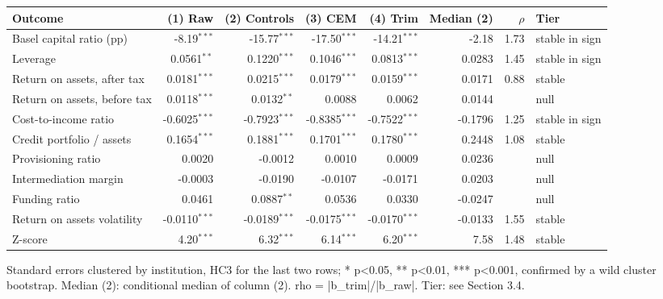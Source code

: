 \footnotesize
\setlength{\tabcolsep}{3pt}
\begin{tabular}{lrrrrrrl}
\toprule
Outcome & (1) Raw & (2) Controls & (3) CEM & (4) Trim & Median (2) & $\rho$ & Tier \\
\midrule
Basel capital ratio (pp) & -8.19$^{***}$ & -15.77$^{***}$ & -17.50$^{***}$ & -14.21$^{***}$ & -2.18 & 1.73 & stable in sign \\
Leverage & 0.0561$^{**}$ & 0.1220$^{***}$ & 0.1046$^{***}$ & 0.0813$^{***}$ & 0.0283 & 1.45 & stable in sign \\
Return on assets, after tax & 0.0181$^{***}$ & 0.0215$^{***}$ & 0.0179$^{***}$ & 0.0159$^{***}$ & 0.0171 & 0.88 & stable \\
Return on assets, before tax & 0.0118$^{***}$ & 0.0132$^{**}$ & 0.0088 & 0.0062 & 0.0144 &  & null \\
Cost-to-income ratio & -0.6025$^{***}$ & -0.7923$^{***}$ & -0.8385$^{***}$ & -0.7522$^{***}$ & -0.1796 & 1.25 & stable in sign \\
Credit portfolio / assets & 0.1654$^{***}$ & 0.1881$^{***}$ & 0.1701$^{***}$ & 0.1780$^{***}$ & 0.2448 & 1.08 & stable \\
Provisioning ratio & 0.0020 & -0.0012 & 0.0010 & 0.0009 & 0.0236 &  & null \\
Intermediation margin & -0.0003 & -0.0190 & -0.0107 & -0.0171 & 0.0203 &  & null \\
Funding ratio & 0.0461 & 0.0887$^{**}$ & 0.0536 & 0.0330 & -0.0247 &  & null \\
\midrule
Return on assets volatility & -0.0110$^{***}$ & -0.0189$^{***}$ & -0.0175$^{***}$ & -0.0170$^{***}$ & -0.0133 & 1.55 & stable \\
Z-score & 4.20$^{***}$ & 6.32$^{***}$ & 6.14$^{***}$ & 6.20$^{***}$ & 7.58 & 1.48 & stable \\
\bottomrule
\end{tabular}
\begin{tablenotes}[flushleft]\footnotesize
\item Standard errors clustered by institution, HC3 for the last two rows; * p<0.05, ** p<0.01, *** p<0.001, confirmed by a wild cluster bootstrap. Median (2): conditional median of column (2). rho = |b\_trim|/|b\_raw|. Tier: see Section 3.4.
\end{tablenotes}
